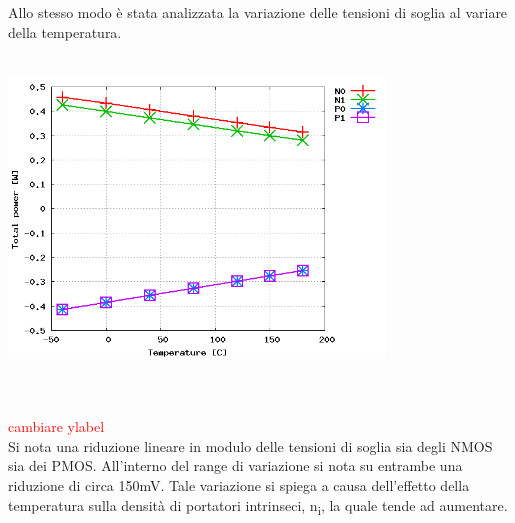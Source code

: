 \documentclass[11pt,  english, makeidx, a4paper, titlepage, oneside]{book}
\begin{document}
\\\\
Allo stesso modo è stata analizzata la variazione delle tensioni di soglia al variare della temperatura. 
\\\\
\centerline{\includegraphics[width=10cm]{./img/Lab_5/vt_temp.png}}
\\\\
\textcolor{red}{cambiare ylabel}
\\
Si nota una riduzione lineare in modulo delle tensioni di soglia sia degli NMOS sia dei PMOS. All'interno del range di variazione si nota su entrambe una riduzione di circa 150mV. Tale variazione si spiega a causa dell'effetto della temperatura sulla densità di portatori intrinseci, n\textsubscript{i}, la quale tende ad aumentare.
\end{document}
